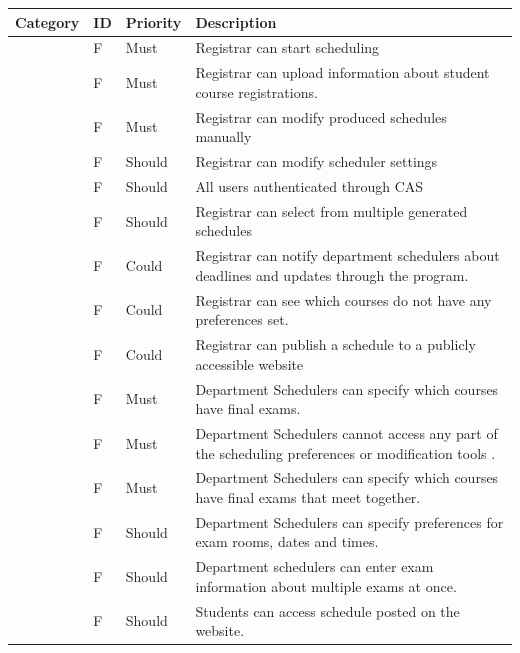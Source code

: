 \documentclass[11pt]{article}
\newcounter{id}
\newcommand{\specid}{\arabic{id}\stepcounter{id}}
\begin{document}
\begin{longtable}{|m{1in}|m{0.3in}|m{0.6in}|m{4.5in}|}
\hline
\textbf{Category}  & \textbf{ID}  & \textbf{Priority}        & \textbf{Description} \\
\hline\hline
\endhead

\hline
\endfoot
\multirow{15}{*}{Functionality }
 &F\specid & Must
 & Registrar can start scheduling \\  \cline{2-4}
 & F\specid & Must
 & Registrar can upload information about student course registrations. \\  \cline{2-4}
 & F\specid & Must
 & Registrar can modify produced schedules manually \\  \cline{2-4}
 & F\specid & Should
 & Registrar can modify scheduler settings \\ \cline{2-4}
 &  F\specid & Should
 & All users authenticated through CAS \\  \cline{2-4}
 & F\specid & Should
 & Registrar can select from multiple generated schedules \\  \cline{2-4}
 & F\specid & Could
 & Registrar can notify department schedulers about deadlines and updates through the program. \\  \cline{2-4}
 & F\specid & Could
 & Registrar can see which courses do not have any preferences set. \\  \cline{2-4}
 & F\specid & Could
 & Registrar can publish a schedule to a publicly accessible website  \\  \cline{2-4}
 & F\specid & Must
 &Department Schedulers can specify which courses have final exams. \\  \cline{2-4}
 & F\specid & Must
 &Department Schedulers cannot access any part of the scheduling preferences or modification tools . \\  \cline{2-4}
 & F\specid & Must
 &Department Schedulers can specify which courses have final exams that meet together. \\  \cline{2-4}
 & F\specid & Should
 &Department Schedulers can specify preferences  for exam rooms, dates and times.\\  \cline{2-4}
 &F\specid & Should
 & Department schedulers can enter exam information about multiple exams at once.  \\  \cline{2-4}

 & F\specid & Should
 &  Students can access schedule posted on the website.\\  \hline\hline


\end{longtable}
\end{document}
